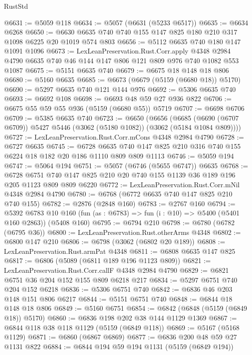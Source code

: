 \begin{lexlean}{RustStd}
\begin{coremodule}
@6631 := @5059 @118
@6634 := @5057 (@6631 (@5233 @6517))
@6635 := @6634 @6268
@6650 := @6630 @6635 @740 @740 @155 @147 @825 @180 @210 @317 @1098 @6225 @20 @1019 @574 @803
@6656 := @5112 @6635 @740 @180 @147 @1091 @1096
@6673 := LexLeanPreservation.Rust.Corr.apply
    @4348
    @2984
    @4790
    @6635
    @740
    @46
    @144
    @147
    @806
    @121
    @809
    @976
    @740
    @1082
    @553
    @1087
@6675 := @5151 @6635 @740
@6679 := @6675 @18 @148 @18 @806
@6680 := @5160 @6635
@6685 := @6673 (@6679 (@5159 (@6680 @18)) @5170)
@6690 := @5297 @6635 @740 @121 @144 @976
@6692 := @5306 @6635 @740
@6693 := @6692 @108
@6698 := @6693 @48 @59 @27 @936 @822
@6706 := @6675 @55 @59 @55 @936 (@5159 (@6680 @55)) @5719
@6707 := @6698 @6706
@6709 := @5385 @6635 @740
@6723 := @6650
    (@6656
      (@6685 (@6690 (@6707 @6709)) @5427 @5446 (@3062 (@5180 @1082)) (@3062 (@5184 @1084 @809))))
@6727 := LexLeanPreservation.Rust.Corr.mCons @4348 @2984 @4790
@6728 := @6727 @6635
@6745 := @6728
    @6635
    @740
    @147
    @825
    @210
    @316
    @740
    @155
    @6224
    @18
    @182
    @20
    @186
    @1110
    @809
    @809
    @1113
@6746 := @5059 @194
@6747 := @5064 @194
@6751 := @5057 (@6746 (@5655 @6747)) @6635
@6768 := @6728
    @6751
    @740
    @147
    @825
    @210
    @20
    @740
    @155
    @1139
    @36
    @189
    @196
    @205
    @1123
    @809
    @809
    @6220
@6772 := LexLeanPreservation.Rust.Corr.mNil @4348 @2984 @4790
@6780 := @6768 (@6772 @6635 @740 @147 @825 @210 @740 @155)
@6782 := @2876 (@2848 @160)
@6783 := @2767 @160
@6794 := @5392
    @6783
    @10
    @160
    (fun (as : @6783) => fun (i : @10) => @5400 (@5401 @160 @2863))
    (@5408 @160)
@6795 := @6794 @210
@6798 := @6780 (@6782 (@6795 @36))
@6800 := LexLeanPreservation.Rust.otherArms @4348
@6802 := @6800 @147 @210
@6806 := @6798 (@3062 (@6802 @20 @189))
@6808 := LexLeanPreservation.Rust.armPat @4348
@6811 := @6808 @6635 @147 @825
@6817 := @6806 (@5089 (@6811 @189 @196 @1123 @809))
@6821 := LexLeanPreservation.Rust.Corr.callF @4348 @2984 @4790
@6829 := @6821 @6751 @36 @204 @152 @155 @809 @6218 @217
@6834 := @5297 @6751 @740 @204 @152 @6218
@6836 := @5306 @6751 @740
@6842 := @6836 @46 @203 @148 @151 @806 @6217
@6844 := @5151 @6751 @740
@6848 := @6844 @18 @148 @18 @806
@6849 := @5160 @6751
@6854 := @6842 (@6848 (@5159 (@6849 @18)) @5170)
@6860 := @6836 @198 @202 @38 @144 @1129 @1369
@6867 := @6844 @118 @38 @118 @1129 (@5159 (@6849 @118))
@6869 := @5167 (@5168 @1129)
@6871 := @6860 (@6867 @6869)
@6877 := @6836 @200 @48 @59 @27 @1131 @822
@6884 := @6844 @194 @59 @194 @1131 (@5159 (@6849 @194))

\end{coremodule}
\end{lexlean}
